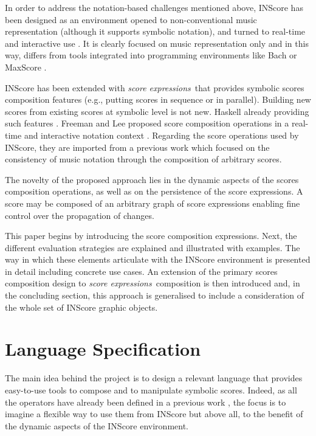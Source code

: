 \documentclass{article}
\newcommand{\sExpr}{\emph{score expressions}}
\begin{document}
In order to address the notation-based challenges mentioned above, INScore \cite{Fober:12a,fober14c} has been designed as an environment opened to non-conventional music representation (although it supports symbolic notation), and turned to real-time and interactive use \cite{Fober:13b, Fober:14b}. It is clearly focused on music representation only and in this way, differs from tools integrated into programming environments like Bach \cite{agostini12b} or MaxScore \cite{didko08}. 

INScore has been extended with \sExpr\ that provides symbolic scores composition features (e.g., putting scores in sequence or in parallel). Building new scores from existing scores at symbolic  level is not new. Haskell already providing such features \cite{Quick:2013:GAM:2505341.2505345}. Freeman and Lee proposed score composition operations in a real-time and interactive notation context \cite{Lee:2013}. Regarding the score operations used by INScore, they are imported from a previous work \cite{fober12b} which focused on the consistency of music notation through the composition of arbitrary scores. 

The novelty of the proposed approach lies in the dynamic aspects of the scores composition operations, as well as on the persistence of the score expressions. A score may be composed of an arbitrary graph of score expressions enabling fine control over the propagation of changes.

This paper begins by introducing the score composition expressions. Next, the different evaluation strategies are explained and illustrated with examples. The way in which these elements articulate with the INScore environment is presented in detail including concrete use cases. An extension of the primary scores composition design to \sExpr\ composition is then introduced and, in the concluding section, this approach is generalised to include a consideration of the whole set of INScore graphic objects.  


\section{Language Specification}\label{language}
\label{languageSpec}
The main idea behind the project is to design a relevant language that provides easy-to-use tools to compose and to manipulate symbolic scores. Indeed, as all the operators have already been defined in a previous work \cite{fober12b}, the focus is to imagine a flexible way to use them from INScore but above all, to the benefit of the dynamic aspects of the INScore environment.
\end{document}
